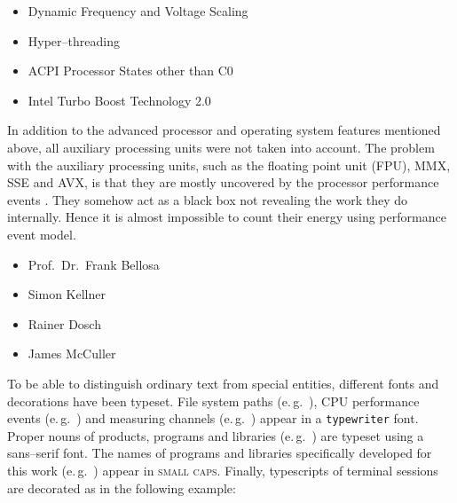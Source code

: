 \begin{itemize}

\item Dynamic Frequency and Voltage Scaling \cite{DVFS}

\item Hyper--threading \cite{HT}

\item ACPI Processor States other than C0 \cite{ACPI}

\item Intel\TReg{} Turbo Boost Technology 2.0 \cite{IntelTurboBoost}

\end{itemize}

In addition to the advanced processor and operating system features mentioned
above, all auxiliary processing units were not taken into account. The
problem with the auxiliary processing units, such as the floating point unit
(FPU), MMX\cite{wiki:MMX}, SSE\cite{wiki:SSE} and AVX\cite{AVX}, is that
they are mostly uncovered by the processor performance events
\cite{intel2011events}. They somehow act as a black box not revealing the
work they do internally. Hence it is almost impossible to count their energy
using performance event model.


\begin{itemize}

\item Prof.\ Dr.\ Frank Bellosa

\item Simon Kellner

\item Rainer Dosch

\item James McCuller

\end{itemize}


\label{sec:preliminaries}

To be able to distinguish ordinary text from special entities, different fonts
and decorations have been typeset. File system paths (e.\,g.\ ),
CPU performance events (e.\,g.\ \JWctrCLK{}) and measuring channels (e.\,g.\ 
) appear in a \texttt{typewriter} font. Proper nouns of
products, programs and libraries (e.\,g.\ \JWTleaps{}) are typeset using a
\textsf{sans--serif} font. The names of programs and libraries specifically
developed for this work (e.\,g.\ \JWTdd{}) appear in \textsc{small caps}.
Finally, typescripts of terminal sessions are decorated as in the following
example:

